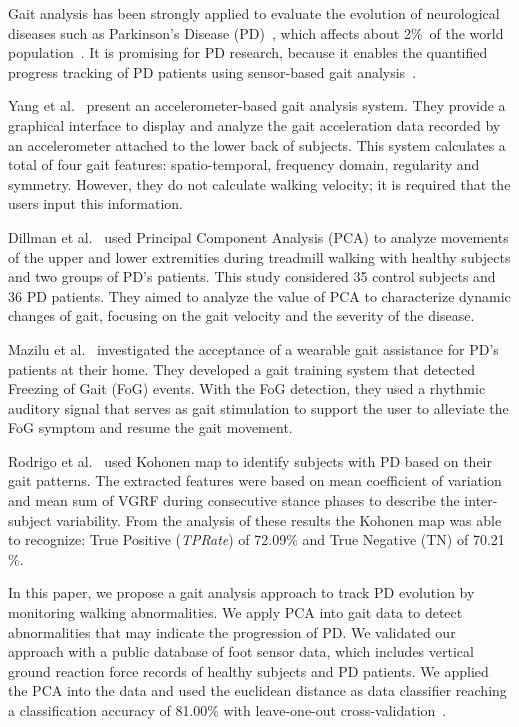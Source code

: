 \documentclass[10pt, conference, compsocconf]{IEEEtran}
\begin{document}
Gait analysis has been strongly applied to evaluate the evolution of neurological diseases such as Parkinson's Disease (PD)~\cite{gait2014}, which affects about 2$\%$\ of the world population~\cite{world2006neurological}. It is promising for PD research, because it enables the quantified progress tracking of  PD patients using sensor-based gait analysis~\cite{gaitusingsensorsreview2012}. 
 
Yang et al.~\cite{igait2012} present an accelerometer-based gait analysis system. They provide a graphical interface to display and analyze the gait acceleration data recorded by an accelerometer attached to the lower back of subjects. This system calculates a total of four gait features: spatio-temporal, frequency domain, regularity and symmetry. However, they do not calculate walking velocity; it is required that the users input this information. 

Dillman et al.~\cite{dillmann2014} used Principal Component Analysis (PCA) to analyze movements of the upper and lower extremities during treadmill walking with healthy subjects and two groups of PD's patients. This study considered 35 control subjects and 36 PD patients. They aimed to analyze the value of PCA to characterize dynamic changes of gait, focusing on the gait velocity and the severity of the disease.  

Mazilu et al.~\cite{mazilu2015} investigated the acceptance of a wearable gait assistance for PD's patients at their home. They developed a gait training system that detected Freezing of Gait (FoG) events. With the FoG detection, they used a rhythmic auditory signal that serves as gait stimulation to support the user to alleviate the FoG symptom and resume the gait movement. %

Rodrigo et al.~\cite{rodrigo2012} 
used Kohonen map to identify subjects with PD based on their gait patterns. The extracted features were based on mean coefficient of variation and mean sum of VGRF during consecutive stance phases to describe the inter-subject variability. From the analysis of these results the Kohonen map was able to recognize: True Positive (\textit{TPRate}) of 72.09$\%$ and True Negative (TN) of 70.21$\%$. %

In this paper, we propose a gait analysis approach to track PD evolution by monitoring walking abnormalities. We apply PCA into gait data to detect abnormalities that may indicate the progression of PD. We validated our approach with a public database of foot sensor data, which includes vertical ground reaction force records of healthy subjects and PD patients. We applied the PCA into the data and used the euclidean distance as data classifier reaching a classification accuracy of 81.00\% with leave-one-out cross-validation~\cite{datamining2005}.
\end{document}
